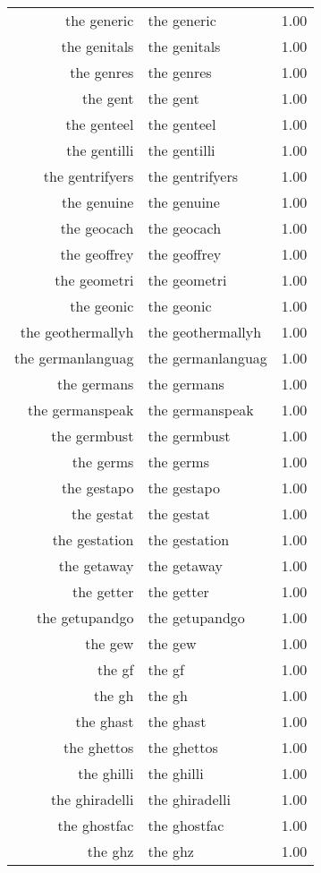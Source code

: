 \begin{table}[ht]
\begin{tabular}{rlr}
  the generic & the generic & 1.00 \\ 
  the genitals & the genitals & 1.00 \\ 
  the genres & the genres & 1.00 \\ 
  the gent & the gent & 1.00 \\ 
  the genteel & the genteel & 1.00 \\ 
  the gentilli & the gentilli & 1.00 \\ 
  the gentrifyers & the gentrifyers & 1.00 \\ 
  the genuine & the genuine & 1.00 \\ 
  the geocach & the geocach & 1.00 \\ 
  the geoffrey & the geoffrey & 1.00 \\ 
  the geometri & the geometri & 1.00 \\ 
  the geonic & the geonic & 1.00 \\ 
  the geothermallyh & the geothermallyh & 1.00 \\ 
  the germanlanguag & the germanlanguag & 1.00 \\ 
  the germans & the germans & 1.00 \\ 
  the germanspeak & the germanspeak & 1.00 \\ 
  the germbust & the germbust & 1.00 \\ 
  the germs & the germs & 1.00 \\ 
  the gestapo & the gestapo & 1.00 \\ 
  the gestat & the gestat & 1.00 \\ 
  the gestation & the gestation & 1.00 \\ 
  the getaway & the getaway & 1.00 \\ 
  the getter & the getter & 1.00 \\ 
  the getupandgo & the getupandgo & 1.00 \\ 
  the gew & the gew & 1.00 \\ 
  the gf & the gf & 1.00 \\ 
  the gh & the gh & 1.00 \\ 
  the ghast & the ghast & 1.00 \\ 
  the ghettos & the ghettos & 1.00 \\ 
  the ghilli & the ghilli & 1.00 \\ 
  the ghiradelli & the ghiradelli & 1.00 \\ 
  the ghostfac & the ghostfac & 1.00 \\ 
  the ghz & the ghz & 1.00 \\ 

\end{tabular}
\end{table}
